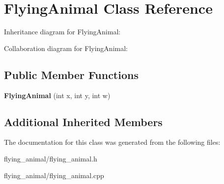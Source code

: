 \hypertarget{classFlyingAnimal}{}\section{Flying\+Animal Class Reference}
\label{classFlyingAnimal}


Inheritance diagram for Flying\+Animal\+:


Collaboration diagram for Flying\+Animal\+:
\subsection*{Public Member Functions}
\begin{DoxyCompactItemize}
\item 
{\bfseries Flying\+Animal} (int x, int y, int w)\hypertarget{classFlyingAnimal_aade22873ec72f0d61668d23aab226936}{}\label{classFlyingAnimal_aade22873ec72f0d61668d23aab226936}

\end{DoxyCompactItemize}
\subsection*{Additional Inherited Members}


The documentation for this class was generated from the following files\+:\begin{DoxyCompactItemize}
\item 
flying\+\_\+animal/flying\+\_\+animal.\+h\item 
flying\+\_\+animal/flying\+\_\+animal.\+cpp\end{DoxyCompactItemize}
